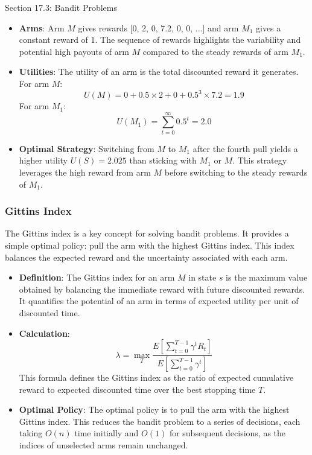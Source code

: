 \begin{notes}{Section 17.3: Bandit Problems}
\begin{highlight}
        \begin{itemize}
            \item \textbf{Arms}: Arm \(M\) gives rewards [0, 2, 0, 7.2, 0, 0, ...] and arm \(M_1\) gives a constant reward of 1. The sequence of rewards highlights the variability and potential high 
            payouts of arm \(M\) compared to the steady rewards of arm \(M_1\).
            \item \textbf{Utilities}: The utility of an arm is the total discounted reward it generates. For arm \(M\):
            \[
            U(M) = 0 + 0.5 \times 2 + 0 + 0.5^3 \times 7.2 = 1.9
            \]
            For arm \(M_1\):
            \[
            U(M_1) = \sum_{t=0}^{\infty} 0.5^t = 2.0
            \]
            \item \textbf{Optimal Strategy}: Switching from \(M\) to \(M_1\) after the fourth pull yields a higher utility \(U(S) = 2.025\) than sticking with \(M_1\) or \(M\). This strategy leverages 
            the high reward from arm \(M\) before switching to the steady rewards of \(M_1\).
        \end{itemize}
    
    \end{highlight}
    
    \subsubsection*{Gittins Index}
    
    The Gittins index is a key concept for solving bandit problems. It provides a simple optimal policy: pull the arm with the highest Gittins index. This index balances the expected reward and the 
    uncertainty associated with each arm.
    
    \begin{highlight}
    
        \begin{itemize}
            \item \textbf{Definition}: The Gittins index for an arm \(M\) in state \(s\) is the maximum value obtained by balancing the immediate reward with future discounted rewards. It quantifies 
            the potential of an arm in terms of expected utility per unit of discounted time.
            \item \textbf{Calculation}: 
            \[
            \lambda = \max_T \frac{E\left[\sum_{t=0}^{T-1} \gamma^t R_t\right]}{E\left[\sum_{t=0}^{T-1} \gamma^t\right]}
            \]
            This formula defines the Gittins index as the ratio of expected cumulative reward to expected discounted time over the best stopping time \(T\).
            \item \textbf{Optimal Policy}: The optimal policy is to pull the arm with the highest Gittins index. This reduces the bandit problem to a series of decisions, each taking \(O(n)\) time 
            initially and \(O(1)\) for subsequent decisions, as the indices of unselected arms remain unchanged.
        \end{itemize}
    

\end{highlight}
\end{notes}
